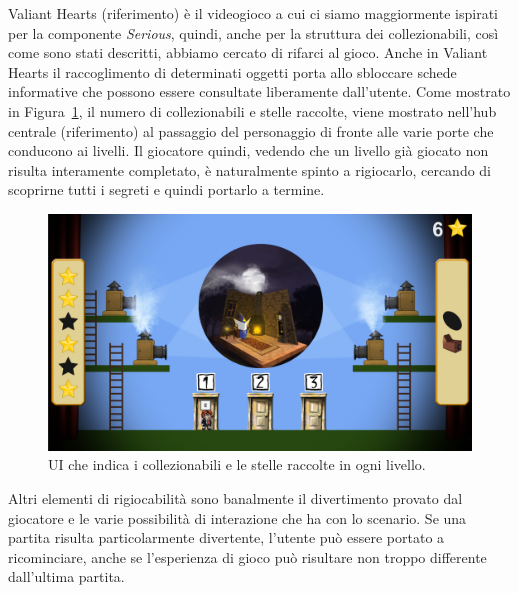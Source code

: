 Valiant Hearts (riferimento) è il videogioco a cui ci siamo maggiormente ispirati per la componente \textit{Serious}, quindi, anche per la struttura dei collezionabili, così come sono stati descritti, abbiamo cercato di rifarci al gioco. Anche in Valiant Hearts il raccoglimento di determinati oggetti porta allo sbloccare schede informative che possono essere consultate liberamente dall’utente.
Come mostrato in Figura~\ref{fig:rigiocabilita_UI_hub}, il numero di collezionabili e stelle raccolte, viene mostrato nell’hub centrale (riferimento) al passaggio del personaggio di fronte alle varie porte che conducono ai livelli. Il giocatore quindi, vedendo che un livello già giocato non risulta interamente completato, è naturalmente spinto a rigiocarlo, cercando di scoprirne tutti i segreti e quindi portarlo a termine.

\begin{figure}%
	\centering
	\includegraphics[width= 0.9\columnwidth]{images/gameDesign/26_hub.jpg}
	\caption{UI che indica i collezionabili e le stelle raccolte in ogni livello.}
	\label{fig:rigiocabilita_UI_hub}
\end{figure} 

Altri elementi di rigiocabilità sono banalmente il divertimento provato dal giocatore e le varie possibilità di interazione che ha con lo scenario.
Se una partita risulta particolarmente divertente, l’utente può essere portato a ricominciare, anche se l’esperienza di gioco può risultare non troppo differente dall’ultima partita.

